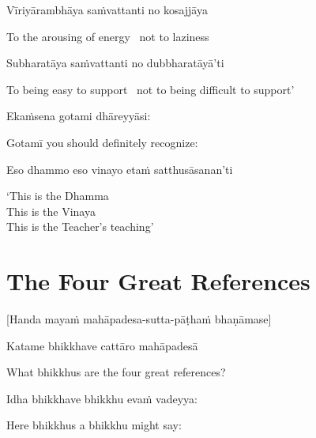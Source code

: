 Vīriyārambhāya saṁvattanti no kosajjāya

\begin{cprenglish}
  To the arousing of energy \breathmark\ not to laziness
\end{cprenglish}

Subharatāya saṁvattanti no dubbharatāyā’ti

\begin{cprenglish}
  To being easy to support \breathmark\ not to being difficult to support’
\end{cprenglish}

Ekaṁsena gotami dhāreyyāsi:

\begin{cprenglish}
  Gotamī
  you should definitely recognize:
\end{cprenglish}

Eso dhammo eso vinayo etaṁ satthusāsanan’ti

\begin{cprenglish}
  ‘This is the Dhamma\\
  This is the Vinaya\\
  This is the Teacher’s teaching’
\end{cprenglish}

\suttaRef{[AN 8.53]}

\clearpage

\section{The Four Great References}
\label{four-great-references}

\begin{center}
  [Handa mayaṁ mahāpadesa-sutta-pāṭhaṁ bhaṇāmase]
\end{center}

Katame bhikkhave cattāro mahāpadesā

\begin{cprenglish}
  What bhikkhus are the four great references?
\end{cprenglish}

Idha bhikkhave bhikkhu evaṁ vadeyya:

\begin{cprenglish}
  Here bhikkhus a bhikkhu might say:
\end{cprenglish}

